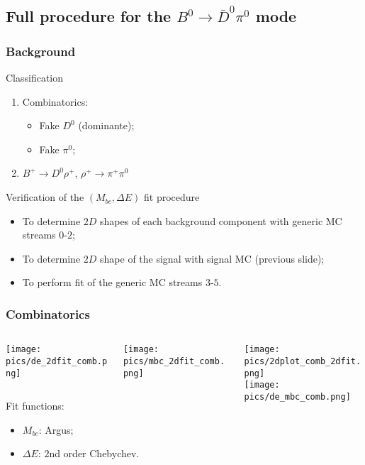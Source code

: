 \documentclass[10 pt,compress,mathserif]{beamer}
\newcommand{\bdpi}{\ensuremath{B^0\to \bar D^0\pi^0}\xspace}
\begin{document}
\subsection{Full procedure for the \bdpi mode}
\begin{frame}
 \frametitle{Background}
 \begin{block}{Classification}
  \begin{enumerate}
   \item Combinatorics:
    \begin{itemize}
     \item Fake $D^0$ (dominante);
     \item Fake $\pi^0$;
    \end{itemize}
   \item $B^+\to D^0\rho^+$, $\rho^+\to\pi^+\pi^0$
  \end{enumerate}
 \end{block}

 \begin{block}{Verification of the $(M_{bc},\Delta E)$ fit procedure}
  \begin{itemize}
   \item To determine $2D$ shapes of each background component with generic MC streams $0$-$2$;
   \item To determine $2D$ shape of the signal with signal MC (previous slide);
   \item To perform fit of the generic MC streams $3$-$5$.
  \end{itemize}
 \end{block}
\end{frame}

\begin{frame}
 \frametitle{Combinatorics}
 \begin{columns}
  \begin{column}{0.7\textwidth}
  \begin{columns}
   \begin{column}{0.5\textwidth}
    \texttt{[image: pics/de\_2dfit\_comb.png]}
   \end{column}
   \begin{column}{0.5\textwidth}
    \texttt{[image: pics/mbc\_2dfit\_comb.png]}
   \end{column}
  \end{columns}
  Fit functions:
 \begin{itemize}
  \item $M_{bc}$: Argus;
  \item $\Delta E$: $2$nd order Chebychev.
 \end{itemize}
 \end{column}
 \begin{column}{0.3\textwidth}
  \texttt{[image: pics/2dplot\_comb\_2dfit.png]}\\
  \texttt{[image: pics/de\_mbc\_comb.png]}
 \end{column}
\end{columns}
\end{frame}
\end{document}
